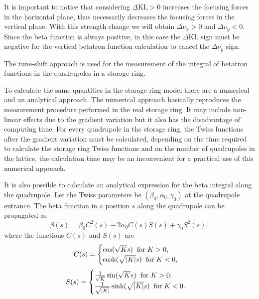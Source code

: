 It is important to notice that considering $\Delta \mathrm{KL} > 0$ increases the focusing forces in the horizontal plane, thus necessarily decreases the focusing forces in the vertical plane. With this strength change we will obtain $\Delta \nu_x > 0$ and $\Delta \nu_y < 0$. Since the beta function is always positive, in this case the $\Delta \mathrm{KL}$ sign must be negative for the vertical betatron function calculation to cancel the $\Delta \nu_y$ sign.

The tune-shift approach is used for the measurement of the integral of betatron functions in the quadrupoles in a storage ring.

To calculate the same quantities in the storage ring model there are a numerical and an analytical approach. The numerical approach basically reproduces the measurement procedure performed in the real storage ring. It may include non-linear effects due to the gradient variation but it also has the disadvantage of computing time. For every quadrupole in the storage ring, the Twiss functions after the gradient variation must be calculated, depending on the time required to calculate the storage ring Twiss functions and on the number of quadrupoles in the lattice, the calculation time may be an inconvenient for a practical use of this numerical approach.

It is also possible to calculate an analytical expression for the beta integral along the quadrupole. Let the Twiss parameters be $(\beta_0, \alpha_0, \gamma_0)$ at the quadrupole entrance. The beta function in a position $s$ along the quadrupole can be propagated as
\begin{equation}
\beta(s) = \beta_0 C^2(s) - 2\alpha_0 C(s)S(s) + \gamma_0S^2(s),
\end{equation}
where the functions $C(s)$ and $S(s)$ are
\[
C(s) = 
\begin{cases}
\cos(\sqrt{K}s) \hspace{0.2cm} \text{for} \hspace{0.1cm} K > 0, \\
\cosh(\sqrt{|K|}s) \hspace{0.2cm} \text{for} \hspace{0.1cm} K < 0, 
\end{cases}
\]
\[
S(s) = 
\begin{cases}
\frac{1}{\sqrt{K}}\sin(\sqrt{K}s) \hspace{0.2cm} \text{for} \hspace{0.1cm} K > 0, \\
\frac{1}{\sqrt{|K|}}\sinh(\sqrt{|K|}s) \hspace{0.2cm} \text{for} \hspace{0.1cm} K < 0.
\end{cases}
\]

